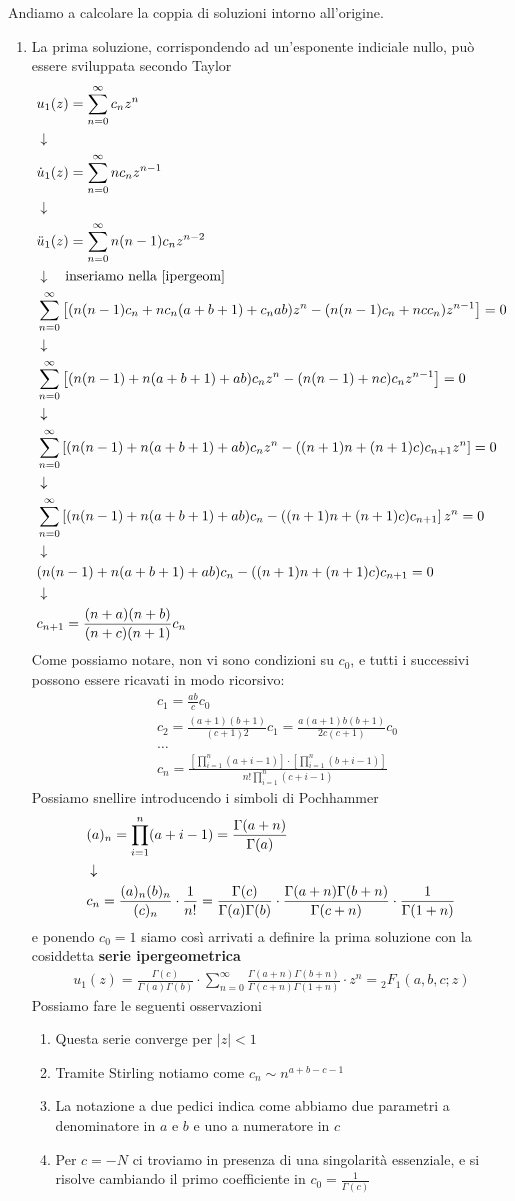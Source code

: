 Andiamo a calcolare la coppia di soluzioni intorno all'origine. 
\begin{enumerate}
	\item La prima soluzione, corrispondendo ad un'esponente indiciale nullo, può essere sviluppata secondo Taylor
	\begin{align}
		&u_1(z) 	   = \sum_{n=0}^{\infty} c_n z^n\\ &\downarrow \nonumber \\
		&\dot{u}_1(z)  = \sum_{n=0}^{\infty} nc_n z^{n-1}\\ &\downarrow \nonumber \\
		&\ddot{u}_1(z) = \sum_{n=0}^{\infty} n(n-1)c_n z^{n-2}\\ &\downarrow \quad \text{inseriamo nella \ref{ipergeom}} \nonumber \\
		&\sum_{n=0}^{\infty}\left[ (n(n-1) c_n + nc_n(a+b+1) + c_n ab) z^n - (n(n-1)c_n + ncc_n)z^{n-1}  \right] = 0\\ &\downarrow \nonumber \\
		&\sum_{n=0}^{\infty}\left[ (n(n-1) + n(a+b+1) + ab)c_n z^n - (n(n-1) + nc)c_nz^{n-1}  \right] = 0\\ &\downarrow \nonumber \\
		&\sum_{n=0}^{\infty}\left[ (n(n-1) + n(a+b+1) + ab)c_n z^n - ((n+1)n + (n+1)c)c_{n+1}z^{n}  \right] = 0\nonumber \\ &\downarrow \nonumber \\
		&\sum_{n=0}^{\infty}\left[ (n(n-1) + n(a+b+1) + ab)c_n - ((n+1)n + (n+1)c)c_{n+1}\right]z^n = 0\nonumber \\ &\downarrow \nonumber \\
		&(n(n-1) + n(a+b+1) + ab)c_n - ((n+1)n + (n+1)c)c_{n+1} = 0\nonumber \\ &\downarrow \nonumber \\
		&c_{n+1} = \frac{(n+a)(n+b)}{(n+c)(n+1)}c_n
	\end{align}
	\newpage
	Come possiamo notare, non vi sono condizioni su $c_0$, e tutti i successivi possono essere ricavati in modo ricorsivo:
	\begin{align}
		&c_1 = \frac{ab}{c}c_0\\
		&c_2 = \frac{(a+1)(b+1)}{(c+1)2}c_1 = \frac{a(a+1)b(b+1)}{2c(c+1)}c_0\\
		&\dots\nonumber\\
		&c_n = \frac{\left[\prod_{i=1}^{n}(a+i-1)\right] \cdot \left[\prod_{i=1}^{n}(b+i-1)\right]  }{n! \prod_{i=1}^{n}(c+i-1) }
	\end{align}
	Possiamo snellire introducendo i simboli di Pochhammer
	\begin{align}
		&(a)_n = \prod_{i=1}^{n}(a+i-1) = \frac{\Gamma(a+n)}{\Gamma(a)}\\ &\downarrow \nonumber \\
		&c_n = \frac{(a)_n (b)_n}{(c)_n} \cdot \frac{1}{n!} = \frac{\Gamma(c)}{\Gamma(a)\Gamma(b)} \cdot \frac{\Gamma(a+n)\Gamma(b+n)}{\Gamma(c+n)} \cdot \frac{1}{\Gamma(1+n)}
	\end{align}
	e ponendo $c_0=1$ siamo così arrivati a definire la prima soluzione con la cosiddetta \textbf{serie ipergeometrica}
	\begin{align}
		u_1(z) = \frac{\Gamma(c)}{\Gamma(a)\Gamma(b)} \cdot \sum_{n=0}^{\infty} \frac{\Gamma(a+n)\Gamma(b+n)}{\Gamma(c+n)\Gamma(1+n)} \cdot z^n = {}_2F_1(a,b,c;z)
	\end{align}
	Possiamo fare le seguenti osservazioni
	\begin{enumerate}
		\item Questa serie converge per $|z|<1$
		\item Tramite Stirling notiamo come $c_n \sim n^{a+b-c-1}$
		\item La notazione a due pedici indica come abbiamo due parametri a denominatore in $a$ e $b$ e uno a numeratore in $c$
		\item Per $c=-N$ ci troviamo in presenza di una singolarità essenziale, e si risolve cambiando il primo coefficiente in $c_0 = \frac{1}{\Gamma(c)}$ 
	\end{enumerate}
	

\end{enumerate}
